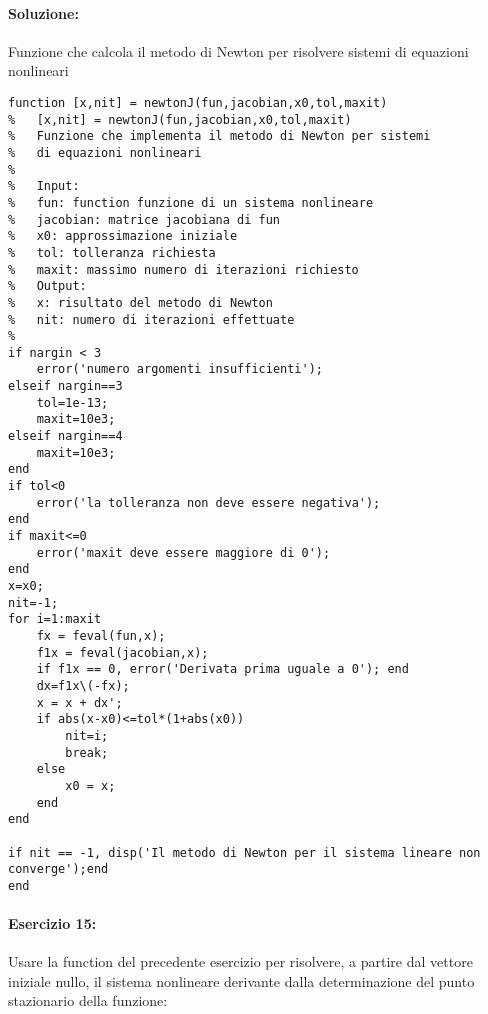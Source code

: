 \documentclass[12pt]{article}
\begin{document}
\paragraph{Soluzione:} Funzione che calcola  il metodo di Newton per risolvere sistemi di equazioni nonlineari
\begin{lstlisting}[frame=single]
function [x,nit] = newtonJ(fun,jacobian,x0,tol,maxit)
%   [x,nit] = newtonJ(fun,jacobian,x0,tol,maxit)
%   Funzione che implementa il metodo di Newton per sistemi 
%   di equazioni nonlineari
%   
%   Input:
%   fun: function funzione di un sistema nonlineare
%   jacobian: matrice jacobiana di fun
%   x0: approssimazione iniziale
%   tol: tolleranza richiesta
%   maxit: massimo numero di iterazioni richiesto
%   Output:
%   x: risultato del metodo di Newton
%   nit: numero di iterazioni effettuate
%
if nargin < 3
    error('numero argomenti insufficienti');
elseif nargin==3
    tol=1e-13;
    maxit=10e3;
elseif nargin==4
    maxit=10e3;
end
if tol<0
    error('la tolleranza non deve essere negativa');
end
if maxit<=0
    error('maxit deve essere maggiore di 0');
end
x=x0;
nit=-1;
for i=1:maxit
    fx = feval(fun,x);
    f1x = feval(jacobian,x);
    if f1x == 0, error('Derivata prima uguale a 0'); end
    dx=f1x\(-fx);
    x = x + dx';
    if abs(x-x0)<=tol*(1+abs(x0))
        nit=i;
        break;
    else
        x0 = x;
    end
end

if nit == -1, disp('Il metodo di Newton per il sistema lineare non converge');end
end    
\end{lstlisting}



\newpage
\paragraph{Esercizio 15:} Usare la function del precedente esercizio per risolvere, a partire dal vettore iniziale nullo, 
il sistema nonlineare derivante dalla determinazione del punto stazionario della funzione:
\end{document}

